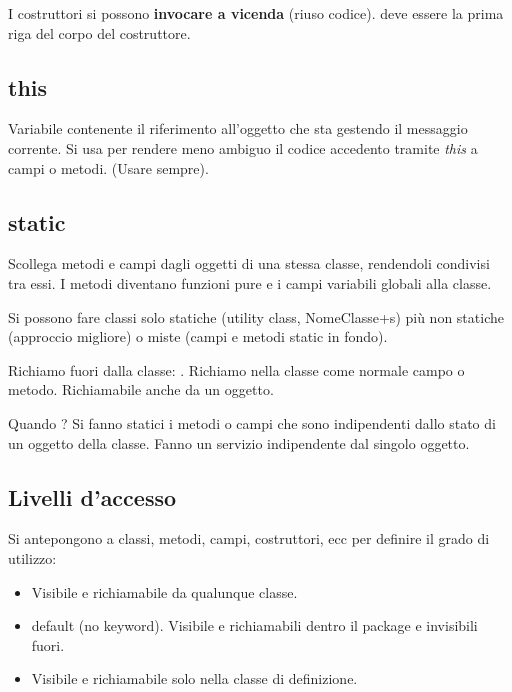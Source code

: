 I costruttori si possono \textbf{invocare a vicenda} (riuso codice).  deve essere la prima riga del corpo del costruttore.


\subsection{this}
Variabile contenente il riferimento all'oggetto che sta gestendo il messaggio corrente. Si usa per rendere meno ambiguo il codice accedento tramite \textit{this} a campi o metodi. (Usare sempre).

\subsection{static}
Scollega metodi e campi dagli oggetti di una stessa classe, rendendoli condivisi tra essi. I metodi diventano funzioni pure e i campi variabili globali alla classe.

Si possono fare classi solo statiche (utility class, NomeClasse+s) più non statiche (approccio migliore) o miste (campi e metodi static in fondo).

Richiamo fuori dalla classe: .
Richiamo nella classe come normale campo o metodo.
Richiamabile anche da un oggetto.


Quando ?
Si fanno statici i metodi o campi che sono indipendenti dallo stato di un oggetto della classe. Fanno un servizio indipendente dal singolo oggetto.

\subsection{Livelli d'accesso}
Si antepongono a classi, metodi, campi, costruttori, ecc per definire il grado di utilizzo:
\begin{itemize}
	\item {} Visibile e richiamabile da qualunque classe.
	\item {} default (no keyword). Visibile e richiamabili dentro il package e invisibili fuori.
	\item {} Visibile e richiamabile solo nella classe di definizione.
\end{itemize}

